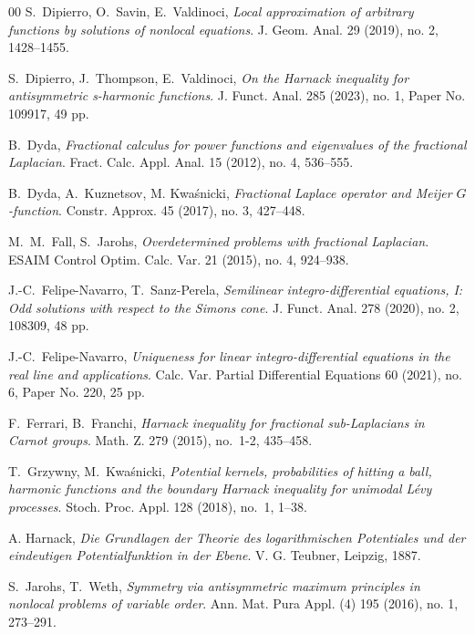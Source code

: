 \documentclass[a4paper,12pt,reqno]{amsart}
\numberwithin{equation}{section}
\theoremstyle{definition}
\theoremstyle{notation}
\begin{document}
\begin{thebibliography}{00}
S.~Dipierro, O.~Savin, E.~Valdinoci,
\emph{Local approximation of arbitrary functions by solutions of nonlocal equations}.
J. Geom. Anal. 29 (2019), no. 2, 1428--1455.


S.~Dipierro, J.~Thompson, E.~Valdinoci,
\emph{On the Harnack inequality for antisymmetric s-harmonic functions}.
J. Funct. Anal. 285 (2023), no. 1, Paper No. 109917, 49 pp.


B.~Dyda, \emph{Fractional calculus for power functions and eigenvalues of the fractional Laplacian}.
Fract. Calc. Appl. Anal. 15 (2012), no. 4, 536--555.


B.~Dyda, A.~Kuznetsov, M. Kwa\'snicki, \emph{Fractional Laplace operator and Meijer $G$-function}.
Constr. Approx. 45 (2017), no. 3, 427--448. 


M.~M.~Fall, S.~Jarohs, \emph{Overdetermined problems with fractional Laplacian}. ESAIM Control Optim. Calc. Var. 21 (2015), no. 4, 924--938.


J.-C.~Felipe-Navarro, T.~Sanz-Perela, \emph{Semilinear integro-differential equations, I: Odd solutions with respect to the Simons cone}.
J. Funct. Anal. 278 (2020), no. 2, 108309, 48 pp.


J.-C.~Felipe-Navarro, \emph{Uniqueness for linear integro-differential equations in the real line and applications}.
Calc. Var. Partial Differential Equations 60 (2021), no. 6, Paper No. 220, 25 pp.


F.~Ferrari, B.~Franchi, \emph{Harnack inequality for fractional sub-Laplacians in Carnot
groups}. Math. Z. 279 (2015), no.~1-2, 435--458.




T.~Grzywny, M.~Kwaśnicki,
\emph{Potential kernels, probabilities of hitting a ball, harmonic functions and the boundary Harnack inequality for unimodal Lévy processes}.
Stoch. Proc. Appl. 128 (2018), no.~1, 1--38.




A. Harnack, \emph{Die Grundlagen der Theorie des logarithmischen Potentiales und der eindeutigen Potentialfunktion in der Ebene}.
V. G. Teubner, Leipzig, 1887.






S.~Jarohs, T.~Weth, \emph{Symmetry via antisymmetric maximum principles in nonlocal problems of variable order}. 
Ann. Mat. Pura Appl. (4) 195 (2016), no. 1, 273--291.



\end{thebibliography}
\end{document}
